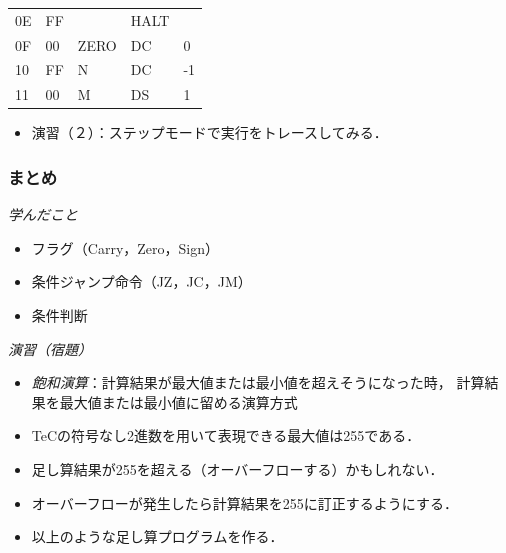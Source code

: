 \documentclass[handout]{beamer}        %
\begin{document}
\begin{frame}
\begin{minipage}{0.5\columnwidth}
{\begin{center}
\begin{tabular}{|l|l|l|l l|}
        0E & FF    &      & HALT &         \\
        0F & 00    & ZERO & DC   & 0       \\
        10 & FF    & N    & DC   & -1      \\
        11 & 00    & M    & DS   & 1       \\
        \hline
      \end{tabular}
    \end{center}}
  \end{minipage}
  \vfill
  \begin{itemize}
  \item 演習（２）：ステップモードで実行をトレースしてみる．
  \end{itemize}
\end{frame}

\begin{frame}
  \frametitle{まとめ}
  \emph{学んだこと}
  \begin{itemize}
  \item フラグ（Carry，Zero，Sign）
  \item 条件ジャンプ命令（JZ，JC，JM）
  \item 条件判断
  \end{itemize}
  \vfill

  \emph{演習（宿題）}
  \begin{itemize}
  \item \emph{飽和演算}：計算結果が最大値または最小値を超えそうになった時，
    計算結果を最大値または最小値に留める演算方式
  \item TeCの符号なし2進数を用いて表現できる最大値は255である．
  \item 足し算結果が255を超える（オーバーフローする）かもしれない．
  \item オーバーフローが発生したら計算結果を255に訂正するようにする．
  \item 以上のような足し算プログラムを作る．
  \end{itemize}
  \vfill
\end{frame}
\end{document}

